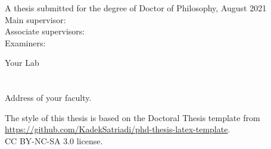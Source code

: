 \vspace*{\fill}
\begin{small}

\textbf{\authorname} 

\textit{\ttitle}

A thesis submitted for the degree of Doctor of Philosophy, August 2021\\
Main supervisor: \supname\\
Associate supervisors:  \\
Examiners: 

\textbf{\univname}

Your Lab\\
\deptname\\
\facname\\
Address of your faculty.

\vspace{1cm}
\begin{footnotesize}
The style of this thesis is based on the Doctoral Thesis template from\\
\url{https://github.com/KadekSatriadi/phd-thesis-latex-template}.\\CC BY-NC-SA 3.0 license.


\end{footnotesize}

\end{small}